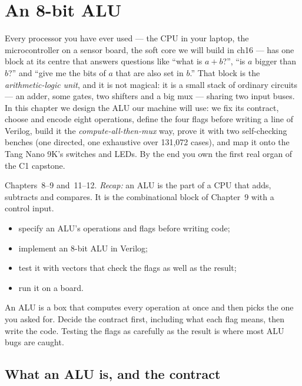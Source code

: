 \chapter{An 8-bit ALU}\label{ch:alu8}

Every processor you have ever used --- the CPU in your laptop, the
microcontroller on a sensor board, the soft core we will build in
ch16 --- has one block at its centre that answers questions like
``what is $a+b$?'', ``is $a$ bigger than $b$?'' and ``give me the bits
of $a$ that are also set in $b$.'' That block is the
\emph{arithmetic-logic unit}, and it is not magical: it is a small
stack of ordinary circuits --- an adder, some gates, two shifters and
a big mux --- sharing two input buses. In this chapter we design the
ALU our machine will use: we fix its contract, choose and encode eight
operations, define the four flags before writing a line of Verilog,
build it the \emph{compute-all-then-mux} way, prove it with two
self-checking benches (one directed, one exhaustive over
131{,}072 cases), and map it onto the Tang Nano 9K's switches and
LEDs. By the end you own the first real organ of the C1 capstone.

\begin{rulebox}
Chapters~8--9 and~11--12. \emph{Recap:} an ALU is the part of a CPU that adds, subtracts and compares. It is the combinational block of Chapter~9 with a control input.
\end{rulebox}
\begin{wins}
\begin{itemize}
\item specify an ALU's operations and flags before writing code;
\item implement an 8-bit ALU in Verilog;
\item test it with vectors that check the flags as well as the result;
\item run it on a board.
\end{itemize}
\end{wins}
\begin{principle}
An ALU is a box that computes every operation at once and then picks the one you asked for. Decide the contract first, including what each flag means, then write the code. Testing the flags as carefully as the result is where most ALU bugs are caught.
\end{principle}

\section{What an ALU is, and the contract}\label{sec:contract}

